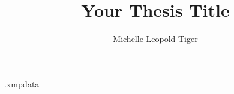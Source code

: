 \begin{filecontents*}{\jobname.xmpdata}
\end{filecontents*}
%
\documentclass[oneside,singlespacing,raggedright]{lsuthesis}




\usepackage{ifluatex}\ifluatex\usepackage{unicode-math,fontspec}
\else\usepackage[utf8]{inputenc}\usepackage[T1]{fontenc}\fi
\usepackage{amsmath}




\usepackage{lsutitle}
\title{Your Thesis Title}
\author{Michelle Leopold Tiger}




\frontmatter

\maketitle


\begin{centeredpage}
\copyright\ 2015\\
Michelle L.\ Tiger
\end{centeredpage}  


